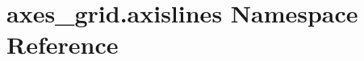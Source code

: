 \hypertarget{namespaceaxes__grid_1_1axislines}{}\section{axes\+\_\+grid.\+axislines Namespace Reference}
\label{namespaceaxes__grid_1_1axislines}
